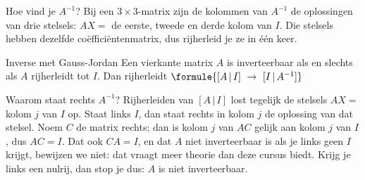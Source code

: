 Hoe vind je $A^{-1}$? Bij een $3 \times 3$-matrix zijn de kolommen van $A^{-1}$ de oplossingen van drie stelsels: $AX = $ de eerste, tweede en derde kolom van $I$. Die stelsels hebben dezelfde coëfficiëntenmatrix, dus rijherleid je ze in één keer.

\begin{theorie}
\begin{stelling}{Inverse met Gauss-Jordan}
Een vierkante matrix $A$ is inverteerbaar als en slechts als $A$ rijherleidt tot $I$. Dan rijherleidt \quad $\formule{[A \,|\, I] \ \to \ [I \,|\, A^{-1}]}$
\end{stelling}
\end{theorie}

Waarom staat rechts $A^{-1}$? Rijherleiden van $[A \,|\, I]$ lost tegelijk de stelsels $AX = $ kolom $j$ van $I$ op. Staat links $I$, dan staat rechts in kolom $j$ de oplossing van dat stelsel. Noem $C$ de matrix rechts; dan is kolom $j$ van $AC$ gelijk aan kolom $j$ van $I$, dus $AC = I$. Dat ook $CA = I$, en dat $A$ niet inverteerbaar is als je links geen $I$ krijgt, bewijzen we niet: dat vraagt meer theorie dan deze cursus biedt. Krijg je links een nulrij, dan stop je dus: $A$ is niet inverteerbaar.

